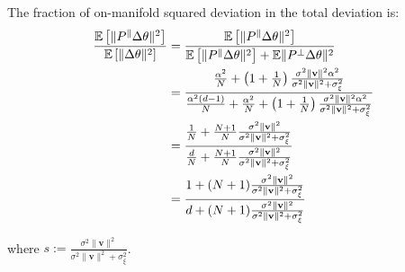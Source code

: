     The fraction of on-manifold squared deviation in the total deviation is:
    \begin{align}
    \frac{ \mathbb{E}\left[\|P^{\parallel}\Delta\theta\|^2\right] }{ \mathbb{E}\left[\|\Delta\theta\|^2\right] }
    &= \frac{ \mathbb{E}\left[\|P^{\parallel}\Delta\theta\|^{2}\right] }{ \mathbb{E}\left[\|P^{\parallel}\Delta\theta\|^{2}\right] + \mathbb{E}\|P^{\perp}\Delta\theta\|^{2} } \notag\\
    &= \frac{ \frac{\alpha^{2}}{N} + \left(1 + \frac{1}{N}\right) \frac{ \sigma^{2} \|\mathbf{v}\|^{2} \alpha^{2} }{ \sigma^{2} \|\mathbf{v}\|^{2} + \sigma_{\xi}^{2} } }
      { \frac{ \alpha^{2}(d-1)}{N} + \frac{\alpha^{2}}{N} + \left(1 + \frac{1}{N}\right) \frac{ \sigma^{2}\|\mathbf{v}\|^{2} \alpha^{2} }{ \sigma^{2}\|\mathbf{v}\|^{2} + \sigma_{\xi}^{2} } } \notag\\
    &= \frac{ \frac{1}{N} + \frac{N+1}{N} \frac{ \sigma^{2} \|\mathbf{v}\|^{2} }{ \sigma^{2} \|\mathbf{v}\|^{2} + \sigma_{\xi}^{2} } }
      { \frac{d}{N} + \frac{N+1}{N} \frac{ \sigma^{2} \|\mathbf{v}\|^{2} }{ \sigma^{2}\|\mathbf{v}\|^{2} + \sigma_{\xi}^{2} } } \notag\\
    &= \frac{ 1 + (N+1) \frac{ \sigma^{2}\|\mathbf{v}\|^{2} }{ \sigma^{2}\|\mathbf{v}\|^{2} + \sigma_{\xi}^{2} } }
             { d + (N+1)\frac{ \sigma^{2}\|\mathbf{v}\|^{2} }{ \sigma^{2}\|\mathbf{v}\|^{2} + \sigma_{\xi}^{2} } }
    \end{align}
    
    where $s:=\frac{\sigma^{2}\|\mathbf{v}\|^{2}}{\sigma^{2}\|\mathbf{v}\|^{2}+\sigma_{\xi}^{2}}$. 
    
